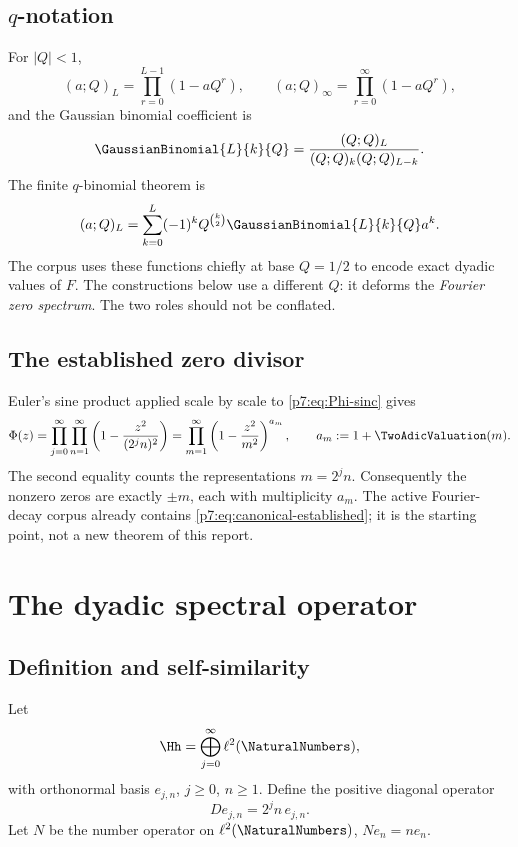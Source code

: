 \documentclass[11pt]{article}
\numberwithin{equation}{section}
\theoremstyle{definition}
\theoremstyle{remark}
\begin{document}
\subsection{$q$-notation}

For $|Q|<1$,
\[
 (a;Q)_L=\prod_{r=0}^{L-1}(1-aQ^r),
 \qquad
 (a;Q)_\infty=\prod_{r=0}^{\infty}(1-aQ^r),
\]
and the Gaussian binomial coefficient is
\[
 \GaussianBinomial{L}{k}{Q}=\frac{(Q;Q)_L}{(Q;Q)_k(Q;Q)_{L-k}}.
\]
The finite $q$-binomial theorem is
\begin{equation}\label{p7:eq:q-binomial}
 (a;Q)_L=\sum_{k=0}^{L}(-1)^kQ^{\binom{k}{2}}
 \GaussianBinomial{L}{k}{Q}a^k.
\end{equation}
The corpus uses these functions chiefly at base $Q=1/2$ to encode exact dyadic values of $F$.  The constructions below use a different $Q$: it deforms the \emph{Fourier zero spectrum}.  The two roles should not be conflated.

\subsection{The established zero divisor}

Euler's sine product applied scale by scale to \cref{p7:eq:Phi-sinc} gives
\begin{equation}\label{p7:eq:canonical-established}
 \Phi(z)=\prod_{j=0}^{\infty}\prod_{n=1}^{\infty}
 \left(1-\frac{z^2}{(2^jn)^2}\right)
 =\prod_{m=1}^{\infty}
 \left(1-\frac{z^2}{m^2}\right)^{a_m},
 \qquad a_m:=1+\TwoAdicValuation(m).
\end{equation}
The second equality counts the representations $m=2^jn$.  Consequently the nonzero zeros are exactly $\pm m$, each with multiplicity $a_m$.  The active Fourier-decay corpus already contains \cref{p7:eq:canonical-established}; it is the starting point, not a new theorem of this report.

\section{The dyadic spectral operator}

\subsection{Definition and self-similarity}

Let
\[
 \Hh=\bigoplus_{j=0}^{\infty}\ell^2(\NaturalNumbers),
\]
with orthonormal basis $e_{j,n}$, $j\ge0$, $n\ge1$.  Define the positive diagonal operator
\begin{equation}\label{p7:eq:D-def}
 De_{j,n}=2^jn\,e_{j,n}.
\end{equation}
Let $N$ be the number operator on $\ell^2(\NaturalNumbers)$, $Ne_n=ne_n$.
\end{document}
